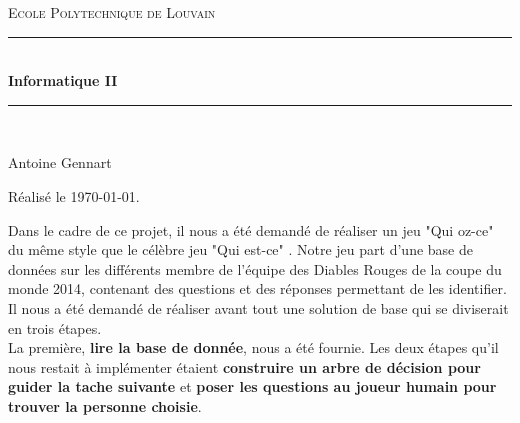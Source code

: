 \documentclass[12pt]{article}
\begin{document}
\newcommand{\HRule}{\rule{\linewidth}{0.5mm}}

\begin{titlepage}

\renewcommand{\HRule}{\rule{\linewidth}{0.5mm}}

\center 

\textsc{\LARGE Ecole Polytechnique de Louvain}\\[1cm]


\HRule \\[0.4cm]
{ \huge \bfseries Informatique II} 
\HRule \\[1cm]

\vspace{3cm}


\vspace{4cm}

\begin{minipage}{6cm}
\begin{center}
Antoine Gennart 
\end{center}
\end{minipage}
\begin{center}
Réalisé le \today.
\end{center}

\end{titlepage}

Dans le cadre de ce projet, il nous a été demandé de réaliser un jeu "Qui oz-ce" du même style que le célèbre jeu "Qui est-ce" . Notre jeu part d'une base de données sur les différents membre de l'équipe des Diables Rouges de la coupe du monde 2014, contenant des questions et des réponses permettant de les identifier. \\

Il nous a été demandé de réaliser avant tout une solution de base qui se diviserait en trois étapes.\\La première, \textbf{lire la base de donnée}, nous a été fournie. Les deux étapes qu'il nous restait à implémenter étaient \textbf{construire un arbre de décision pour guider la tache suivante} et \textbf{poser les questions au joueur humain pour trouver la personne choisie}.\\
\end{document}
